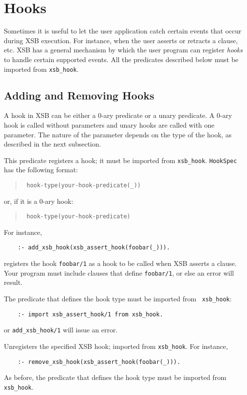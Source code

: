 \chapter{Hooks} \label{hooks}

Sometimes it is useful to let the user application catch certain
events that occur during XSB execution. For instance, when the user
asserts or retracts a clause, etc.  XSB has a general mechanism by
which the user program can register \emph{hooks} to handle certain
supported events. All the predicates described below must be imported
from {\tt xsb\_hook}.


\section{Adding and Removing Hooks}

A hook in XSB can be either a 0-ary predicate or a unary predicate.
A 0-ary hook is called without parameters and unary hooks are called with
one parameter. The nature of the parameter depends on the type of the hook,
as described in the next subsection.


\begin{description}
  

This predicate registers a hook; it must be imported from {\tt xsb\_hook}.
{\tt HookSpec} has the following format:
\begin{quote}
 {\tt
   hook-type(your-hook-predicate(\_))
   }
\end{quote}
or, if it is a 0-ary hook:
\begin{quote}
  {\tt
   hook-type(your-hook-predicate)
   }  
\end{quote}
For instance, 
\begin{verbatim}
    :- add_xsb_hook(xsb_assert_hook(foobar(_))).
\end{verbatim}
registers the hook {\tt foobar/1} as a hook to be called when XSB
asserts a clause. Your program must include
clauses that define {\tt foobar/1}, or else an error will result.

The predicate that defines the hook type must be imported from {\tt
  xsb\_hook}:
\begin{verbatim}
    :- import xsb_assert_hook/1 from xsb_hook.  
\end{verbatim}
or {\tt add\_xsb\_hook/1} will issue an error.

 

Unregisters the specified XSB hook; imported from {\tt xsb\_hook}. For
instance,
\begin{verbatim}
    :- remove_xsb_hook(xsb_assert_hook(foobar(_))).
\end{verbatim}
As before, the predicate that defines the hook type must be imported from
{\tt xsb\_hook}.
\end{description}


